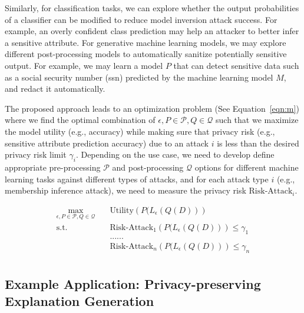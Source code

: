 \documentclass{article}
\newcommand{\eqr}{\ensuremath{P(L_{\epsilon}(Q(D))}}
\begin{document}
Similarly, for classification tasks, we can explore whether the output probabilities of a classifier can be modified to reduce model inversion attack success. For example, an overly confident class prediction may help an attacker to better infer a sensitive attribute. For generative machine learning models, we may explore different post-processing models to automatically sanitize potentially sensitive output. For example, we may learn a model $P$ that can detect sensitive data such as a social security number (ssn) predicted by the machine learning model $M$, and redact it automatically. 

The proposed approach leads to an optimization problem (See Equation~\ref{eqn:m}) where we find the optimal combination of $\epsilon, P \in \mathcal{P}, Q \in \mathcal{Q}$ such that we maximize the  model utility (e.g., accuracy) while making sure that privacy risk (e.g., sensitive attribute prediction accuracy) due to an attack $i$ is less than the desired privacy risk limit $\gamma_i$. Depending on the use case, we need to develop define appropriate pre-processing $\mathcal{P}$ and post-processing $\mathcal{Q}$  options for different machine learning tasks against  different types of attacks, and for each attack type $i$ (e.g., membership inference attack), we need to measure the privacy risk  $\mbox{Risk-Attack}_i$. 

\begin{equation}
\begin{aligned}
\max_{\epsilon, P \in \mathcal{P},Q \in \mathcal{Q}} \quad & \mbox{Utility}(\eqr)\\
\textrm{s.t.} \quad & \mbox{Risk-Attack}_1( \eqr ) \leq \gamma_1\\
& ......\\
                    &\mbox{Risk-Attack}_n(\eqr   )  \leq \gamma_n \\
\end{aligned}
\label{eqn:m}
\end{equation}




\subsection{Example Application: Privacy-preserving Explanation Generation}
\end{document}

